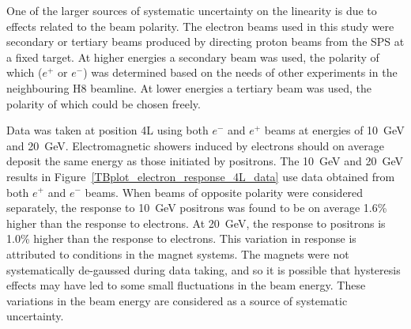 One of the larger sources of systematic uncertainty on the linearity is due to effects related to the beam polarity. The electron beams used in this study were secondary or tertiary beams produced by directing proton beams from the SPS at a fixed target. At higher energies a secondary beam was used, the polarity of which ($e^+$ or $e^-$) was determined based on the needs of other experiments in the neighbouring H8 beamline. At lower energies a tertiary beam was used, the polarity of which could be chosen freely. %

Data was taken at position 4L using both $e^-$ and $e^+$ beams at energies of 10~GeV and 20~GeV. Electromagnetic showers induced by electrons should on average deposit the same energy as those initiated by positrons. The 10~GeV and 20~GeV results in Figure~\ref{TBplot_electron_response_4L_data} use data obtained from both $e^+$ and $e^-$ beams. When beams of opposite polarity were considered separately, the response to 10~GeV positrons was found to be on average 1.6\% higher than the response to electrons. At 20~GeV, the response to positrons is 1.0\% higher than the response to electrons. This variation in response is attributed to conditions in the magnet systems. The magnets were not systematically de-gaussed during data taking, and so it is possible that hysteresis effects may have led to some small fluctuations in the beam energy. These variations in the beam energy are considered as a source of systematic uncertainty.

%







